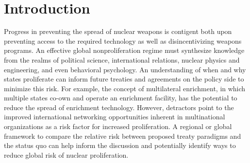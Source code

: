 \section{Introduction}
\label{s_motive}





Progress in preventing the spread of nuclear weapons is contigent both upon preventing access to the required technology as well as disincentivizing weapons programs. An effective global nonproliferation regime must synthesize knowledge from the realms of political science, international relations, nuclear physics and engineering, and even behavioral psychology. An understanding of when and why states proliferate can inform future treaties and agreements on the policy side to minimize this risk. For example, the concept of multilateral enrichment, in which multiple states co-own and operate an enrichment facility, has the potential to reduce the spread of enrichment technology. However, detractors point to the improved international networking opportunities inherent in multinational organizations as a risk factor for increased proliferation. A regional or global framework to compare the relative risk between proposed treaty paradigms and the status quo can help inform the discussion and potentially identify ways to reduce global risk of nuclear proliferation.

